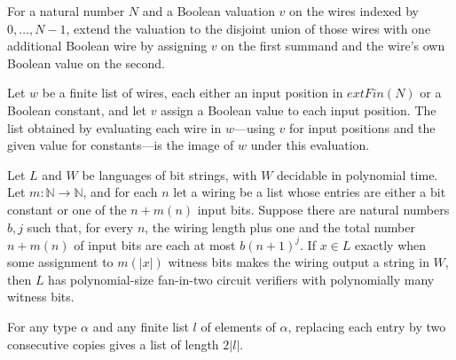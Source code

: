 \begin{definition}
\label{Randomized.wireVal}
\leanok
For a natural number $N$ and a Boolean valuation $v$ on the wires indexed by
$0,\ldots,N-1$, extend the valuation to the disjoint union of those wires with one
additional Boolean wire by assigning $v$ on the first summand and the wire's own Boolean
value on the second.
\end{definition}

\begin{theorem}
\label{Randomized.ofFn_inputValues_vectorOfList}
\leanok
{}
Let $w$ be a finite list of wires, each either an input position in $	ext{Fin}(N)$ or a
Boolean constant, and let $v$ assign a Boolean value to each input position. The list
obtained by evaluating each wire in $w$—using $v$ for input positions and the given
value for constants—is the image of $w$ under this evaluation.
\end{theorem}

\begin{theorem}
\label{Randomized.inNPPoly_of_wiring}
\leanok
{}
Let $L$ and $W$ be languages of bit strings, with $W$ decidable in polynomial time. Let
$m:\mathbb{N}\to\mathbb{N}$, and for each $n$ let a wiring be a list whose entries are
either a bit constant or one of the $n+m(n)$ input bits. Suppose there are natural
numbers $b,j$ such that, for every $n$, the wiring length plus one and the total number
$n+m(n)$ of input bits are each at most $b(n+1)^j$. If $x\in L$ exactly when some
assignment to $m(|x|)$ witness bits makes the wiring output a string in $W$, then $L$
has polynomial-size fan-in-two circuit verifiers with polynomially many witness bits.
\end{theorem}

\begin{theorem}
\label{Randomized.length_flatMap_dup}
\leanok
{}
For any type $\alpha$ and any finite list $l$ of elements of $\alpha$, replacing each
entry by two consecutive copies gives a list of length $2|l|$.
\end{theorem}

